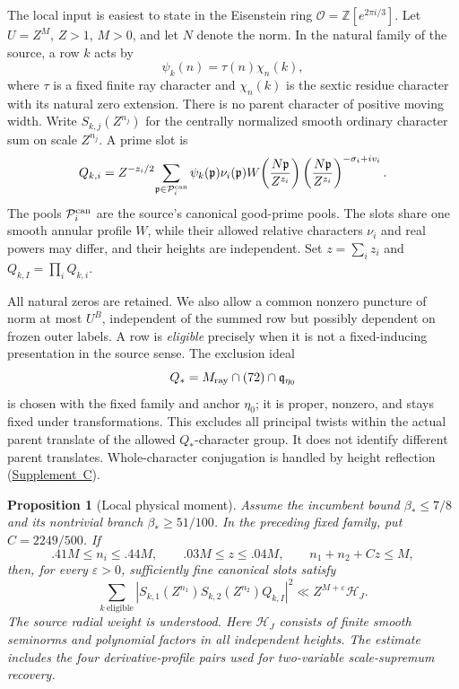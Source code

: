 \documentclass[11pt]{article}
\newtheorem{proposition}[theorem]{Proposition}
\newcommand{\OO}{\mathcal O}
\newcommand{\eps}{\varepsilon}
\newcommand{\supp}[1]{\href{supplement.pdf}{Supplement~#1}}
\begin{document}
The local input is easiest to state in the Eisenstein ring
$\OO=\mathbb Z[e^{2\pi i/3}]$. Let $U=Z^M$, $Z>1$, $M>0$, and let $N$
denote the norm. In the natural family of the source, a row $k$ acts by
\[
 \psi_k(n)=\tau(n)\chi_n(k),
\]
where $\tau$ is a fixed finite ray character and $\chi_n(k)$ is the
sextic residue character with its natural zero extension.
There is no parent character of positive moving width. Write
$S_{k,j}(Z^{n_j})$ for the centrally normalized smooth ordinary character
sum on scale $Z^{n_j}$. A prime slot is
\begin{equation}\label{eq:slot}
 Q_{k,i}=Z^{-z_i/2}\!\sum_{\mathfrak p\in\mathcal P_i^{\rm can}}
 \psi_k(\mathfrak p)\nu_i(\mathfrak p)
 W\!\left(\frac{N\mathfrak p}{Z^{z_i}}\right)
 \left(\frac{N\mathfrak p}{Z^{z_i}}\right)^{-\sigma_i+iv_i}.
\end{equation}
The pools $\mathcal P_i^{\rm can}$ are the source's canonical good-prime
pools. The slots share one smooth annular profile $W$, while their
allowed relative characters $\nu_i$ and real powers may differ, and their
heights are independent.
Set $z=\sum_i z_i$ and $Q_{k,I}=\prod_iQ_{k,i}$.

All natural zeros are retained. We also allow a common nonzero puncture
of norm at most $U^B$, independent of the summed row but possibly
dependent on frozen outer labels. A row is \emph{eligible} precisely
when it is not a fixed-inducing presentation in the source sense.
The exclusion ideal
\[
 Q_*=M_{\rm ray}\cap(72)\cap\mathfrak q_{\eta_0}
\]
is chosen with the fixed family and anchor $\eta_0$; it is proper,
nonzero, and stays fixed under transformations. This excludes all
principal twists within the actual parent translate of the allowed
$Q_*$-character group. It does not identify different parent translates.
Whole-character conjugation is handled by height reflection
(\supp{C}).

\begin{proposition}[Local physical moment]\label{prop:local}
Assume the incumbent bound $\beta_*\le7/8$ and its nontrivial branch
$\beta_*\ge51/100$. In the preceding fixed family, put $C=2249/500$.
If
\begin{equation}\label{eq:window}
 .41M\le n_i\le .44M,\qquad .03M\le z\le .04M,
 \qquad n_1+n_2+Cz\le M,
\end{equation}
then, for every $\eps>0$, sufficiently fine canonical slots satisfy
\begin{equation}\label{eq:moment}
 \sum_{k\ \mathrm{eligible}}
 |S_{k,1}(Z^{n_1})S_{k,2}(Z^{n_2})Q_{k,I}|^2
 \ll Z^{M+\eps}\mathcal H_J.
\end{equation}
The source radial weight is understood. Here $\mathcal H_J$ consists of
finite smooth seminorms and polynomial factors in all independent
heights. The estimate includes the four derivative-profile pairs used
for two-variable scale-supremum recovery.
\end{proposition}
\end{document}
